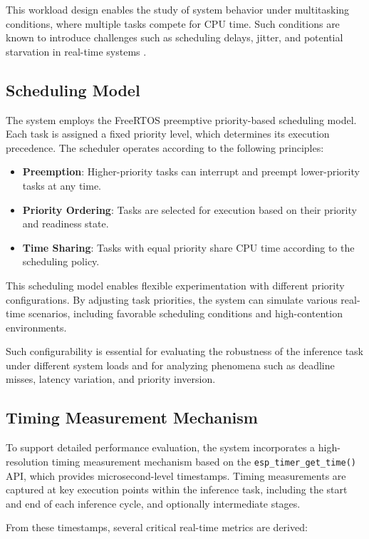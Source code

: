 \documentclass[conference]{IEEEtran}
\begin{document}
This workload design enables the study of system behavior under multitasking conditions, where multiple tasks compete for CPU time. Such conditions are known to introduce challenges such as scheduling delays, jitter, and potential starvation in real-time systems \cite{sha1990priority}.

\subsection{Scheduling Model}
The system employs the FreeRTOS preemptive priority-based scheduling model. Each task is assigned a fixed priority level, which determines its execution precedence. 
The scheduler operates according to the following principles:

\begin{itemize}
    \item \textbf{Preemption}: Higher-priority tasks can interrupt and preempt lower-priority tasks at any time.
    
    \item \textbf{Priority Ordering}: Tasks are selected for execution based on their priority and readiness state.
    
    \item \textbf{Time Sharing}: Tasks with equal priority share CPU time according to the scheduling policy.
\end{itemize}

This scheduling model enables flexible experimentation with different priority configurations. By adjusting task priorities, the system can simulate various real-time scenarios, including favorable scheduling conditions and high-contention environments.

Such configurability is essential for evaluating the robustness of the inference task under different system loads and for analyzing phenomena such as deadline misses, latency variation, and priority inversion.

\subsection{Timing Measurement Mechanism}

To support detailed performance evaluation, the system incorporates a high-resolution timing measurement mechanism based on the \texttt{esp\_timer\_get\_time()} API, which provides microsecond-level timestamps. 
Timing measurements are captured at key execution points within the inference task, including the start and end of each inference cycle, and optionally intermediate stages. 

From these timestamps, several critical real-time metrics are derived:
\end{document}
